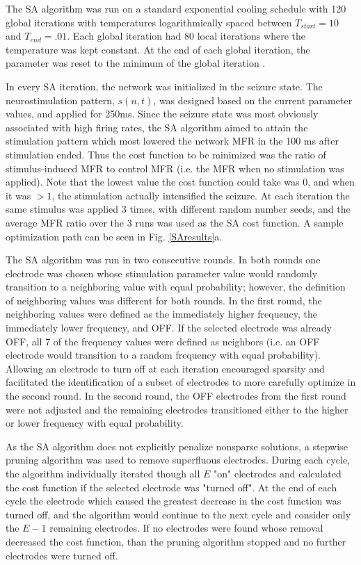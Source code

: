 \documentclass[journal,twoside,web]{ieeecolor}
\newcommand{\len}{250}   %
\begin{document}
The SA algorithm was run on a standard exponential cooling schedule with 120 global iterations with temperatures logarithmically spaced between $T_{start}=10$ and $T_{end}=.01$.
Each global iteration had 80 local iterations where the temperature was kept constant.
At the end of each global iteration, the parameter was reset to the minimum of the global iteration \cite{henderson03}.

In every SA iteration, the network was initialized in the seizure state.
The neurostimulation pattern, $s(n,t)$, was designed based on the current parameter values, and applied for \len ms.
Since the seizure state was most obviously associated with high firing rates, the SA algorithm aimed to attain the stimulation pattern which most lowered the network MFR in the 100 ms after stimulation ended.
Thus the cost function to be minimized was the ratio of stimulus-induced MFR to control MFR (i.e. the MFR when no stimulation was applied).
Note that the lowest value the cost function could take was 0, and when it was $>1$, the stimulation actually intensified the seizure.
At each iteration the same stimulus was applied 3 times, with different random number seeds, and the average MFR ratio over the 3 runs was used as the SA cost function.
A sample optimization path can be seen in Fig. \ref{SAresults}a.

The SA algorithm was run in two consecutive rounds.
In both rounds one electrode was chosen whose stimulation parameter value would randomly transition to a neighboring value with equal probability; however, the definition of neighboring values was different for both rounds. 
In the first round, the neighboring values were defined as the immediately higher frequency, the immediately lower frequency, and OFF.
If the selected electrode was already OFF, all 7 of the frequency values were defined as neighbors (i.e. an OFF electrode would transition to a random frequency with equal probability).
Allowing an electrode to turn off at each iteration encouraged sparsity and facilitated the identification of a subset of electrodes to more carefully optimize in the second round.
In the second round, the OFF electrodes from the first round were not adjusted and the remaining electrodes transitioned either to the higher or lower frequency with equal probability.

As the SA algorithm does not explicitly penalize nonsparse solutions, a stepwise pruning algorithm was used to remove superfluous electrodes.
During each cycle, the algorithm individually iterated though all $E$ "on" electrodes and calculated the cost function if the selected electrode was "turned off".
At the end of each cycle the electrode which caused the greatest decrease in the cost function was turned off, and the algorithm would continue to the next cycle and consider only the $E-1$ remaining electrodes.
If no electrodes were found whose removal decreased the cost function, than the pruning algorithm stopped and no further electrodes were turned off.
\end{document}
